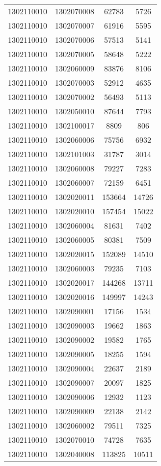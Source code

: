 \begin{longtable}[h]{llcc}
		1302110010 & 1302070008 & 62783 & 5726\\
		1302110010 & 1302070007 & 61916 & 5595\\
		1302110010 & 1302070006 & 57513 & 5141\\
		1302110010 & 1302070005 & 58648 & 5222\\
		1302110010 & 1302060009 & 83876 & 8106\\
		1302110010 & 1302070003 & 52912 & 4635\\
		1302110010 & 1302070002 & 56493 & 5113\\
		1302110010 & 1302050010 & 87644 & 7793\\
		1302110010 & 1302100017 & 8809 & 806\\
		1302110010 & 1302060006 & 75756 & 6932\\
		1302110010 & 1302101003 & 31787 & 3014\\
		1302110010 & 1302060008 & 79227 & 7283\\
		1302110010 & 1302060007 & 72159 & 6451\\
		1302110010 & 1302020011 & 153664 & 14726\\
		1302110010 & 1302020010 & 157454 & 15022\\
		1302110010 & 1302060004 & 81631 & 7402\\
		1302110010 & 1302060005 & 80381 & 7509\\
		1302110010 & 1302020015 & 152089 & 14510\\
		1302110010 & 1302060003 & 79235 & 7103\\
		1302110010 & 1302020017 & 144268 & 13711\\
		1302110010 & 1302020016 & 149997 & 14243\\
		1302110010 & 1302090001 & 17156 & 1534\\
		1302110010 & 1302090003 & 19662 & 1863\\
		1302110010 & 1302090002 & 19582 & 1765\\
		1302110010 & 1302090005 & 18255 & 1594\\
		1302110010 & 1302090004 & 22637 & 2189\\
		1302110010 & 1302090007 & 20097 & 1825\\
		1302110010 & 1302090006 & 12932 & 1123\\
		1302110010 & 1302090009 & 22138 & 2142\\
		1302110010 & 1302060002 & 79511 & 7325\\
		1302110010 & 1302070010 & 74728 & 7635\\
		1302110010 & 1302040008 & 113825 & 10511\\

\end{longtable}
